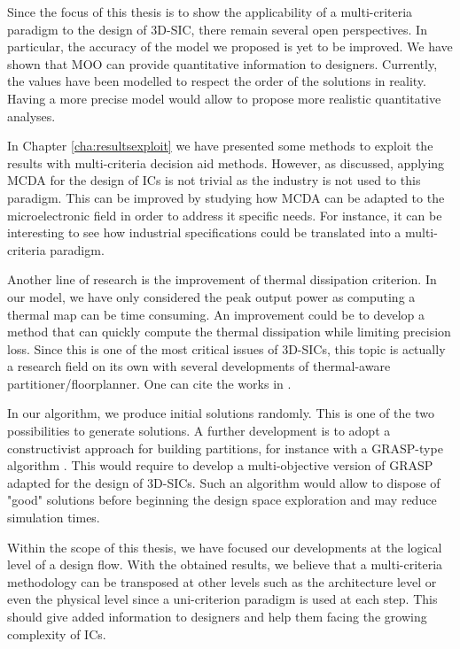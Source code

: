 Since the focus of this thesis is to show the applicability of a multi-criteria paradigm to the design of 3D-SIC, there remain several open perspectives. In particular, the accuracy of the model we proposed is yet to be improved. We have shown that MOO can provide quantitative information to designers. Currently, the values have been modelled to respect the order of the solutions in reality. Having a more precise model would allow to propose more realistic quantitative analyses.

In Chapter \ref{cha:resultsexploit} we have presented some methods to exploit the results with multi-criteria decision aid methods. However, as discussed, applying MCDA for the design of ICs is not trivial as the industry is not used to this paradigm. This can be improved by studying how MCDA can be adapted to the microelectronic field in order to address it specific needs. For instance, it can be interesting to see how industrial specifications could be translated into a multi-criteria paradigm.

Another line of research is the improvement of thermal dissipation criterion. In our model, we have only considered the peak output power as computing a thermal map can be time consuming. An improvement could be to develop a method that can quickly compute the thermal dissipation while limiting precision loss. Since this is one of the most critical issues of 3D-SICs, this topic is actually a research field on its own with several developments of thermal-aware partitioner/floorplanner. One can cite the works in \cite{1594713,1112292,1486402}.

In our algorithm, we produce initial solutions randomly. This is one of the two possibilities to generate solutions. A further development is to adopt a constructivist approach for building partitions, for instance with a GRASP-type algorithm \cite{HarSho87a,DBLP:dblp_conf/sccc/ViannaAVA05}. This would require to develop a multi-objective version of GRASP adapted for the design of 3D-SICs. Such an algorithm would allow to dispose of "good" solutions before beginning the design space exploration and may reduce simulation times.

Within the scope of this thesis, we have focused our developments at the logical level of a design flow. With the obtained results, we believe that a multi-criteria methodology can be transposed at other levels such as the architecture level or even the physical level since a uni-criterion paradigm is used at each step. This should give added information to designers and help them facing the growing complexity of ICs.

